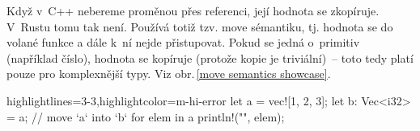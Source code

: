 \documentclass[main.tex]{subfiles}
\begin{document}

Když v~C++ nebereme proměnou přes referenci, její hodnota se zkopíruje. V~Rustu tomu tak
není. Používá totiž tzv. move sémantiku, tj. hodnota se  do volané funkce a
dále k~ní nejde přistupovat. Pokud se jedná o~primitiv (například číslo), hodnota se
kopíruje (protože kopie je triviální)~-- toto tedy platí pouze pro komplexnější typy.
Viz obr.\,\ref{move semantics showcase}. \cite[sekce\,15.2]{byexample}

\obrazek
\begin{rustcode*}{highlightlines={3-3},highlightcolor=m-hi-error}
    let a = vec![1, 2, 3];
    let b: Vec<i32> = a; // move `a` into `b`
    for elem in a {
        println!("{}", elem);
    }
\end{rustcode*}
\newline
{}
\end{document}
